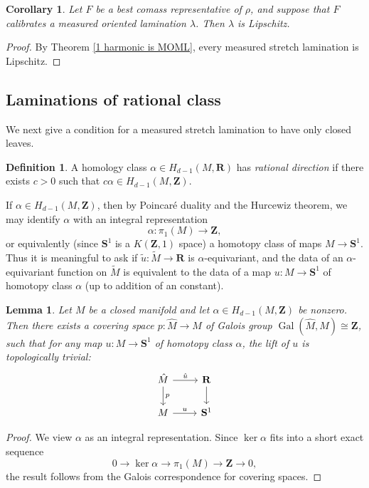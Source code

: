 \documentclass[reqno,11pt]{amsart}
\newcommand{\ZZ}{\mathbf{Z}}
\newcommand{\RR}{\mathbf{R}}
\newcommand{\Sph}{\mathbf S}
\DeclareMathOperator{\Gal}{Gal}
\newcommand{\dfn}[1]{\emph{#1}\index{#1}}
\newtheorem{lemma}[theorem]{Lemma}
\newtheorem{corollary}[theorem]{Corollary}
\theoremstyle{definition}
\newtheorem{definition}[theorem]{Definition}
\numberwithin{equation}{section}
\begin{document}
\begin{corollary}
Let $F$ be a best comass representative of $\rho$, and suppose that $F$ calibrates a measured oriented lamination $\lambda$.
Then $\lambda$ is Lipschitz.
\end{corollary}
\begin{proof}
By Theorem \ref{1 harmonic is MOML}, every measured stretch lamination is Lipschitz.
\end{proof}

\subsection{Laminations of rational class}
We next give a condition for a measured stretch lamination to have only closed leaves.

\begin{definition}
A homology class $\alpha \in H_{d - 1}(M, \RR)$ has \dfn{rational direction} if there exists $c > 0$ such that $c\alpha \in H_{d - 1}(M, \ZZ)$.
\end{definition}

If $\alpha \in H_{d - 1}(M, \ZZ)$, then by Poincar\'e duality and the Hurcewiz theorem, we may identify $\alpha$ with an integral representation
$$\alpha: \pi_1(M) \to \ZZ,$$
or equivalently (since $\Sph^1$ is a $K(\ZZ, 1)$ space) a homotopy class of maps $M \to \Sph^1$.
Thus it is meaningful to ask if $\tilde u: \tilde M \to \RR$ is $\alpha$-equivariant, and the data of an $\alpha$-equivariant function on $\tilde M$ is equivalent to the data of a map $u: M \to \Sph^1$ of homotopy class $\alpha$ (up to addition of an constant).

\begin{lemma}\label{Galois}
Let $M$ be a closed manifold and let $\alpha \in H_{d - 1}(M, \ZZ)$ be nonzero.
Then there exists a covering space $p: \hat M \to M$ of Galois group $\Gal(\hat M, M) \cong \ZZ$, such that for any map $u: M \to \Sph^1$ of homotopy class $\alpha$, the lift of $u$ is topologically trivial:
$$\begin{tikzcd}
\hat M \arrow[r, "\hat u"] \arrow[d, "p"] & \RR \arrow[d] \\
M \arrow[r, "u"] & \Sph^1
\end{tikzcd}$$
\end{lemma}
\begin{proof}
We view $\alpha$ as an integral representation.
Since $\ker \alpha$ fits into a short exact sequence 
$$0 \to \ker \alpha \to \pi_1(M) \to \ZZ \to 0,$$
the result follows from the Galois correspondence for covering spaces.
\end{proof}
\end{document}

